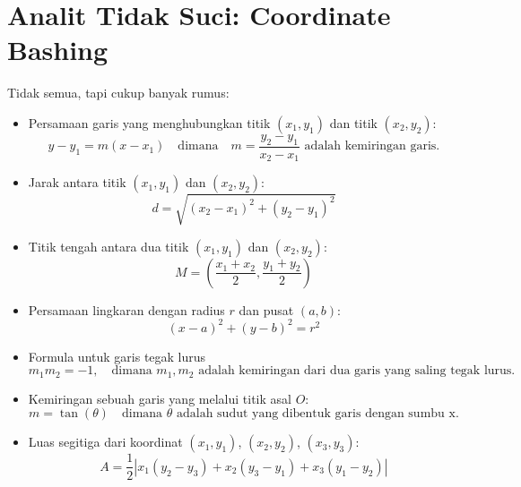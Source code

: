 \documentclass[12pt]{scrartcl}
\begin{document}
\section{Analit Tidak Suci: Coordinate Bashing}
Tidak semua, tapi cukup banyak rumus:
\begin{itemize}
    \item Persamaan garis yang menghubungkan titik $(x_1, y_1)$ dan titik $(x_2, y_2)$:
    \[ y - y_1 = m(x - x_1) \quad \text{dimana} \quad m = \frac{y_2 - y_1}{x_2 - x_1} \text{ adalah kemiringan garis.} \]
    
    \item Jarak antara titik $(x_1, y_1)$ dan $(x_2, y_2)$:
    \[ d = \sqrt{(x_2 - x_1)^2 + (y_2 - y_1)^2} \]
    
    \item Titik tengah antara dua titik $(x_1, y_1)$ dan $(x_2, y_2)$:
    \[ M = \left(\frac{x_1 + x_2}{2}, \frac{y_1 + y_2}{2}\right) \]
    
    \item Persamaan lingkaran dengan radius $r$ dan pusat $(a, b)$:
    \[ (x - a)^2 + (y - b)^2 = r^2 \]
    
    \item Formula untuk garis tegak lurus
    \[ m_1m_2 = -1, \quad \text{dimana } m_1, m_2 \text{ adalah kemiringan dari dua garis yang saling tegak lurus.} \]
    
    \item Kemiringan sebuah garis yang melalui titik asal $O$:
    \[ m = \tan(\theta) \quad \text{dimana } \theta \text{ adalah sudut yang dibentuk garis dengan sumbu x.} \]
    
    \item Luas segitiga dari koordinat $(x_1, y_1)$, $(x_2, y_2)$, $(x_3, y_3)$:
    \[ A = \frac{1}{2} 
    \left| 
    x_1(y_2 - y_3) + x_2(y_3 - y_1) + x_3(y_1 - y_2) 
    \right| \]
\end{itemize}
\end{document}
